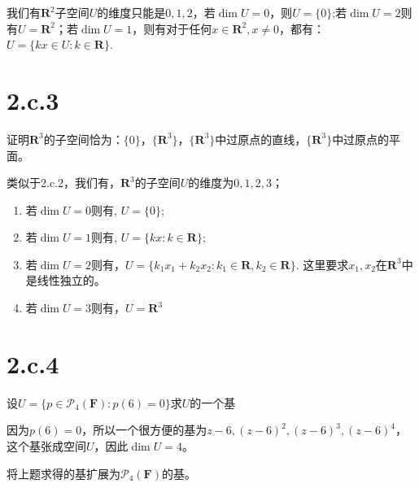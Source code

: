 \documentclass[10pt,a4paper,UTF8]{article}
\begin{document}
\begin{answer}
我们有\(\mathbf{R}^{2}\)子空间\(U\)的维度只能是\(0,1,2\)，若\(\dim U = 0\)，则\(U = \{0\}\);若\(\dim U = 2\)则有\(U = \mathbf{R}^{2}\)；若\(\dim U = 1\)，则有对于任何\(x\in \mathbf{R}^{2},x\neq 0\)，都有：\(U=\{kx\in U:k\in \mathbf{R}\}\).
\end{answer}
\section{2.c.3}
\label{sec:org4633361}


\begin{problem}
证明\(\mathbf{R}^{3}\)的子空间恰为：\(\{0\}\)，\(\{\mathbf{R}^{3}\}\)，\(\{\mathbf{R}^{3}\}\)中过原点的直线，\(\{\mathbf{R}^{3}\}\)中过原点的平面。
\end{problem}

\begin{answer}
类似于2.c.2，我们有，\(\mathbf{R}^{3}\)的子空间\(U\)的维度为\(0,1,2,3\)；

\begin{enumerate}
\item 若\(\dim U = 0\)则有, \(U = \{0\}\);
\item 若\(\dim U = 1\)则有, \(U = \{kx: k\in \mathbf{R}\}\);
\item 若\(\dim U = 2\)则有，\(U = \{k_1x_{1} + k_{2}x_{2}:k_{1}\in \mathbf{R},k_{2}\in \mathbf{R}\}\). 这里要求\(x_{1},x_{2}\)在\(\mathbf{R}^{3}\)中是线性独立的。
\item 若\(\dim U = 3\)则有，\(U = \mathbf{R}^{3}\)
\end{enumerate}
\end{answer}
\section{2.c.4}
\label{sec:orga38e5da}


\begin{problem}
设\(U= \{p\in \mathcal{P}_{4}(\mathbf{F}):p(6)=0\}\)求\(U\)的一个基
\end{problem}

\begin{answer}
因为\(p(6)=0\)，所以一个很方便的基为\(z-6,(z-6)^{2},(z-6)^{3},(z-6)^{4}\)，这个基张成空间\(U\)，因此\(\dim U = 4\)。
\end{answer}

\begin{problem}
将上题求得的基扩展为\(\mathcal{P}_{4}( \mathbf{F})\)的基。
\end{problem}
\end{document}
